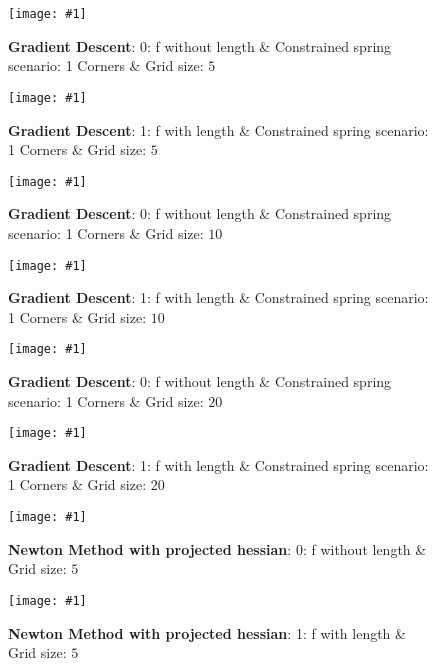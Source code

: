 \documentclass[multi=page,crop,border=15pt,varwidth=120cm]{standalone}
\newcommand{\newresult}[2]{%
\begin{figure}[H]
    \texttt{[image: \#1]}
    \caption{#2}
\end{figure}
}
\begin{document}
\begin{page}
    \begin{minipage}[t]{14cm}
        \newresult{execution_GradientDescent_0_1_5__1_optimized}{\textbf{Gradient Descent}: 0: f without length \& Constrained spring scenario: 1 Corners \& Grid size: $5$}
    \end{minipage}
    \begin{minipage}[t]{14cm}
        \newresult{execution_GradientDescent_1_1_5__1_optimized}{\textbf{Gradient Descent}: 1: f with length \& Constrained spring scenario: 1 Corners \& Grid size: $5$}
    \end{minipage}
\end{page}

\begin{page}
    \begin{minipage}[t]{14cm}
        \newresult{execution_GradientDescent_0_1_10__1_optimized}{\textbf{Gradient Descent}: 0: f without length \& Constrained spring scenario: 1 Corners \& Grid size: $10$}
    \end{minipage}
    \begin{minipage}[t]{14cm}
        \newresult{execution_GradientDescent_1_1_10__1_optimized}{\textbf{Gradient Descent}: 1: f with length \& Constrained spring scenario: 1 Corners \& Grid size: $10$}
    \end{minipage}
\end{page}

\begin{page}
    \begin{minipage}[t]{14cm}
        \newresult{execution_GradientDescent_0_1_20__1_optimized}{\textbf{Gradient Descent}: 0: f without length \& Constrained spring scenario: 1 Corners \& Grid size: $20$}
    \end{minipage}
    \begin{minipage}[t]{14cm}
        \newresult{execution_GradientDescent_1_1_20__1_optimized}{\textbf{Gradient Descent}: 1: f with length \& Constrained spring scenario: 1 Corners \& Grid size: $20$}
    \end{minipage}
\end{page}

\begin{page}
    \begin{minipage}[t]{14cm}
        \newresult{execution_NewtonMethods_1_0_5___optimized}{\textbf{Newton Method with projected hessian}: 0: f without length \& Grid size: $5$}
    \end{minipage}
    \begin{minipage}[t]{14cm}
        \newresult{execution_NewtonMethods_1_1_5___optimized}{\textbf{Newton Method with projected hessian}: 1: f with length \& Grid size: $5$}
    \end{minipage}
\end{page}
\end{document}
